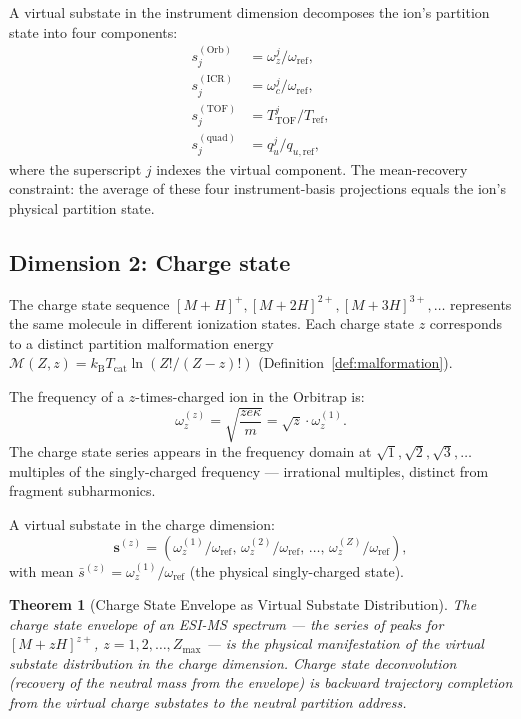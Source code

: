 \documentclass[twocolumn,10pt,a4paper]{article}
\theoremstyle{thmstyle}
\newtheorem{theorem}{Theorem}[section]
\theoremstyle{definition}
\theoremstyle{remark}
\newcommand{\kB}{k_{\mathrm{B}}}
\newcommand{\Mop}{\mathcal{M}}
\newcommand{\Tcat}{T_{\mathrm{cat}}}
\begin{document}
A virtual substate in the instrument dimension decomposes the ion's
partition state into four components:
\begin{align}
s^{(\mathrm{Orb})}_{j} &= \omega_z^j/\omega_{\text{ref}}, \\
s^{(\mathrm{ICR})}_{j} &= \omega_c^j/\omega_{\text{ref}}, \\
s^{(\mathrm{TOF})}_{j} &= T^j_{\mathrm{TOF}}/T_{\text{ref}}, \\
s^{(\mathrm{quad})}_{j} &= q_u^j/q_{u,\text{ref}},
\end{align}
where the superscript $j$ indexes the virtual component.
The mean-recovery constraint: the average of these four
instrument-basis projections equals the ion's physical partition state.

\subsection{Dimension 2: Charge state}

The charge state sequence $[M+H]^+, [M+2H]^{2+}, [M+3H]^{3+}, \ldots$
represents the same molecule in different ionization states. Each charge
state $z$ corresponds to a distinct partition malformation energy
$\Mop(Z, z) = \kB\Tcat\ln(Z!/(Z-z)!)$ (Definition~\ref{def:malformation}).

The frequency of a $z$-times-charged ion in the Orbitrap is:
\begin{equation}
\omega_z^{(z)} = \sqrt{\frac{ze\kappa}{m}} = \sqrt{z}\cdot\omega_z^{(1)}.
\label{eq:charge-freq}
\end{equation}
The charge state series appears in the frequency domain at
$\sqrt{1}, \sqrt{2}, \sqrt{3}, \ldots$ multiples of the singly-charged
frequency --- irrational multiples, distinct from fragment subharmonics.

A virtual substate in the charge dimension:
\begin{equation}
\mathbf{s}^{(z)} = \left(\omega_z^{(1)}/\omega_{\text{ref}},\,
\omega_z^{(2)}/\omega_{\text{ref}},\, \ldots,\,
\omega_z^{(Z)}/\omega_{\text{ref}}\right),
\label{eq:charge-vs}
\end{equation}
with mean $\bar{s}^{(z)} = \omega_z^{(1)}/\omega_{\text{ref}}$ (the
physical singly-charged state).

\begin{theorem}[Charge State Envelope as Virtual Substate Distribution]
\label{thm:charge-envelope}
The charge state envelope of an ESI-MS spectrum --- the series of peaks
for $[M+zH]^{z+}$, $z = 1, 2, \ldots, Z_{\max}$ --- is the physical
manifestation of the virtual substate distribution in the charge
dimension. Charge state deconvolution (recovery of the neutral mass
from the envelope) is backward trajectory completion from the virtual
charge substates to the neutral partition address.
\end{theorem}
\end{document}
